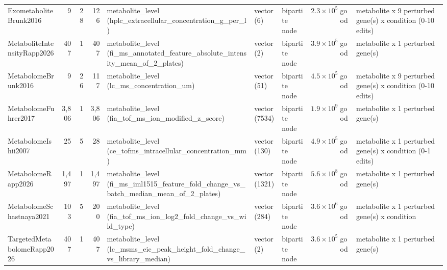 \begin{landscape}
\begin{longtable}{@{}l r r r >{\raggedright\arraybackslash}p{34mm} l l r l >{\raggedright\arraybackslash}p{40mm}@{}}
ExometaboliteBrunk2016 & 9 & 28 & 126 & metabolite\_\allowbreak{}level (hplc\_\allowbreak{}extracellular\_\allowbreak{}concentration\_\allowbreak{}g\_\allowbreak{}per\_\allowbreak{}l) & vector (6) & bipartite node & $2.3\times10^{5}$ & good & metabolite x 9 perturbed gene(s) x condition (0-10 edits) \\
MetaboliteIntensityRapp2026 & 407 & 1 & 407 & metabolite\_\allowbreak{}level (fi\_\allowbreak{}ms\_\allowbreak{}annotated\_\allowbreak{}feature\_\allowbreak{}absolute\_\allowbreak{}intensity\_\allowbreak{}mean\_\allowbreak{}of\_\allowbreak{}2\_\allowbreak{}plates) & vector (2) & bipartite node & $3.9\times10^{5}$ & good & metabolite x 1 perturbed gene(s) \\
MetabolomeBrunk2016 & 9 & 26 & 117 & metabolite\_\allowbreak{}level (lc\_\allowbreak{}ms\_\allowbreak{}concentration\_\allowbreak{}um) & vector (51) & bipartite node & $4.5\times10^{5}$ & good & metabolite x 9 perturbed gene(s) x condition (0-10 edits) \\
MetabolomeFuhrer2017 & 3,806 & 1 & 3,806 & metabolite\_\allowbreak{}level (fia\_\allowbreak{}tof\_\allowbreak{}ms\_\allowbreak{}ion\_\allowbreak{}modified\_\allowbreak{}z\_\allowbreak{}score) & vector (7534) & bipartite node & $1.9\times10^{9}$ & good & metabolite x 1 perturbed gene(s) \\
MetabolomeIshii2007 & 25 & 5 & 28 & metabolite\_\allowbreak{}level (ce\_\allowbreak{}tofms\_\allowbreak{}intracellular\_\allowbreak{}concentration\_\allowbreak{}mm) & vector (130) & bipartite node & $4.9\times10^{5}$ & good & metabolite x 1 perturbed gene(s) x condition (0-1 edits) \\
MetabolomeRapp2026 & 1,497 & 1 & 1,497 & metabolite\_\allowbreak{}level (fi\_\allowbreak{}ms\_\allowbreak{}iml1515\_\allowbreak{}feature\_\allowbreak{}fold\_\allowbreak{}change\_\allowbreak{}vs\_\allowbreak{}batch\_\allowbreak{}median\_\allowbreak{}mean\_\allowbreak{}of\_\allowbreak{}2\_\allowbreak{}plates) & vector (1321) & bipartite node & $5.6\times10^{8}$ & good & metabolite x 1 perturbed gene(s) \\
MetabolomeSchastnaya2021 & 103 & 5 & 200 & metabolite\_\allowbreak{}level (fia\_\allowbreak{}tof\_\allowbreak{}ms\_\allowbreak{}ion\_\allowbreak{}log2\_\allowbreak{}fold\_\allowbreak{}change\_\allowbreak{}vs\_\allowbreak{}wild\_\allowbreak{}type) & vector (284) & bipartite node & $3.6\times10^{6}$ & good & metabolite x 1 perturbed gene(s) x condition \\
TargetedMetabolomeRapp2026 & 407 & 1 & 407 & metabolite\_\allowbreak{}level (lc\_\allowbreak{}msms\_\allowbreak{}eic\_\allowbreak{}peak\_\allowbreak{}height\_\allowbreak{}fold\_\allowbreak{}change\_\allowbreak{}vs\_\allowbreak{}library\_\allowbreak{}median) & vector (2) & bipartite node & $3.6\times10^{5}$ & good & metabolite x 1 perturbed gene(s) \\

\end{longtable}
\end{landscape}
